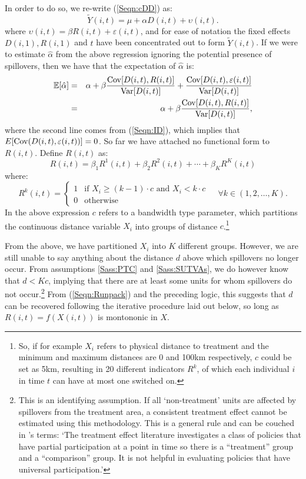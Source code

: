 In order to do so, we re-write (\ref{Seqn:cDD}) as:
\begin{equation}
\label{Seqn:cDDconc}
\tilde{Y}(i,t)=\mu + \alpha D(i,t) + \upsilon(i,t).
\end{equation}
where $\upsilon(i,t)=\beta R(i,t)+\varepsilon(i,t)$, and for ease of notation
the fixed effects $D(i,1), R(i,1)$ and $t$ have been concentrated out to form
$\tilde{Y}(i,t)$.  If we were to estimate $\hat\alpha$ from the above regression
ignoring the potential presence of spillovers, then we have that the 
expectation of $\hat\alpha$ is:
\begin{eqnarray}
\label{Seqn:alphaExp}
\mathbb{E}[\hat\alpha] &=& \alpha + \beta\frac{\mathrm{Cov}[D(i,t),R(i,t)]}{\mathrm{Var}[D(i,t)]}+\frac{\mathrm{Cov}[D(i,t),\varepsilon(i,t)]}{\mathrm{Var}[D(i,t)]} \nonumber \\ 
              &=& \alpha + \beta\frac{\mathrm{Cov}[D(i,t),R(i,t)]}{\mathrm{Var}[D(i,t)]},
\end{eqnarray}
where the second line comes from (\ref{Seqn:ID}), which implies that
$E[\mathrm{Cov}(D(i,t),\varepsilon(i,t))]=0$.  So far we have attached no functional 
form to $R(i,t)$.  Define $R(i,t)$ as:
\begin{equation}
\label{Seqn:Runpack}
R(i,t) = \beta_1R^1(i,t)+\beta_2R^2(i,t)+ \cdots + \beta_KR^K(i,t)
\end{equation}  
where:
\begin{equation}
\label{Seqn:Rpar}
 R^k(i,t) =
  \begin{cases}
   1   & \text{if\ \ } X_i\geq(k-1)\cdot c \text{\ \ and \ } X_i<k\cdot c \\
   0   & \text{otherwise} 
  \end{cases}\ \ \ \ \ \forall k \in (1,2,\ldots,K).
\end{equation}
In the above expression $c$ refers to a bandwidth type parameter, which partitions
the continuous distance variable $X_i$ into groups of distance $c$.\footnote{So, if
for example $X_i$ refers to physical distance to treatment and the minimum and 
maximum distances are 0 and 100km respectively, $c$ could be set as 5km, resulting
in 20 different indicators $R^k$, of which each individual $i$ in time $t$ can
have at most one switched on.}

From the above, we have partitioned $X_i$ into $K$ different groups.  However, we
are still unable to say anything about the distance $d$ above which spillovers no 
longer occur.  From assumptions \ref{Sass:PTC} and \ref{Sass:SUTVAs}, we do however
know that $d<Kc$, implying that there are at least some units for whom spillovers
do not occur.\footnote{This is an identifying assumption.  If all `non-treatment'
units are affected by spillovers from the treatment area, a consistent treatment
effect cannot be estimated using this methodology.  This is a general rule and can 
be couched in \citet{HeckmanVytlacil2005}'s terms: `The treatment effect literature 
investigates a class of policies that have partial participation at a point in time 
so there is a ``treatment'' group and a ``comparison'' group. It is not helpful in 
evaluating policies that have universal participation.'}  From (\ref{Seqn:Runpack}) 
and the preceding logic, this suggests that $d$ can be recovered following the 
iterative procedure laid out below, so long as $R(i,t)=f(X(i,t))$ is montononic in 
$X$.


